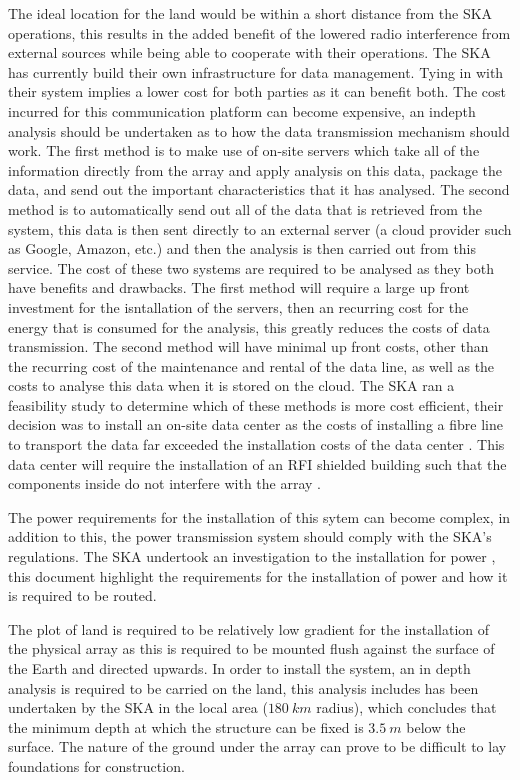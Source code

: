 \documentclass[11pt]{witseiepaper}
\begin{document}
The ideal location for the land would be within a short distance from the SKA operations, this results in the added benefit of the lowered radio interference from external sources while being able to cooperate with their operations. 
The SKA has currently build their own infrastructure for data management. Tying in with their system implies a lower cost for both parties as it can benefit both. The cost incurred for this communication platform can become expensive, an indepth analysis should be undertaken as to how the data transmission mechanism should work.
The first method is to make use of on-site servers which take all of the information directly from the array and apply analysis on this data, package the data, and send out the important characteristics that it has analysed. The second method is to automatically send out all of the data that is retrieved from the system, this data is then sent directly to an external server (a cloud provider such as Google, Amazon, etc.) and then the analysis is then carried out from this service.
The cost of these two systems are required to be analysed as they both have benefits and drawbacks.
The first method will require a large up front investment for the isntallation of the servers, then an recurring cost for the energy that is consumed for the analysis, this greatly reduces the costs of data transmission.
The second method will have minimal up front costs, other than the recurring cost of the maintenance and rental of the data line, as well as the costs to analyse this data when it is stored on the cloud.
The SKA ran a feasibility study to determine which of these methods is more cost efficient, their decision was to install an on-site data center as the costs of installing a fibre line to transport the data far exceeded the installation costs of the data center \cite[p.~17-18]{SKAFibre}.
This data center will require the installation of an RFI shielded building such that the components inside do not interfere with the array \cite[p.~18]{SKAFibre}.

The power requirements for the installation of this sytem can become complex, in addition to this, the power transmission system should comply with the SKA's regulations. The SKA undertook an investigation to the installation for power \cite{SKAFibre}, this document highlight the requirements for the installation of power and how it is required to be routed.  


The plot of land is required to be relatively low gradient for the installation of the physical array as this is required to be mounted flush against the surface of the Earth and directed upwards.
In order to install the system, an in depth analysis is required to be carried on the land, this analysis includes has been undertaken by the SKA in the local area ($180~km$ radius)\cite[p.~95,98]{SKAFibre}, which concludes that the minimum depth at which the structure can be fixed is $3.5~m$ below the surface. The nature of the ground under the array can prove to be difficult to lay foundations for construction.
\end{document}
